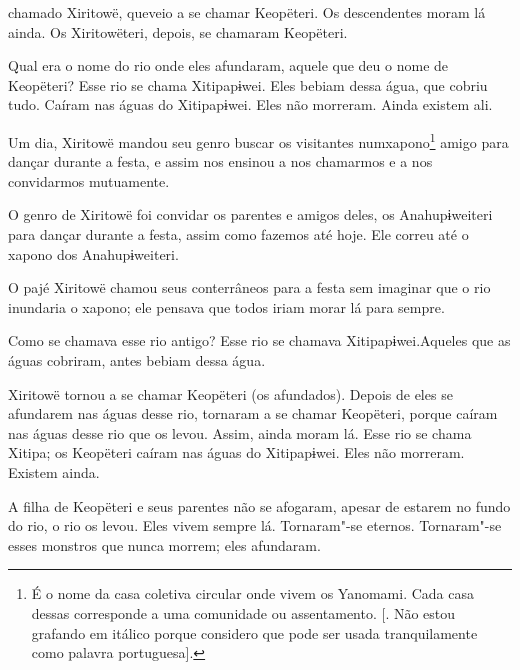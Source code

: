 
 chamado Xiritowë, queveio a se chamar Keopëteri. Os
descendentes moram lá ainda. Os Xiritowëteri, depois, se chamaram
Keopëteri. 

Qual era o nome do rio onde eles afundaram, aquele que deu o nome de
Keopëteri? Esse rio se chama Xitipapɨwei. Eles bebiam dessa água, que
cobriu tudo. Caíram nas águas do Xitipapɨwei. Eles não morreram. Ainda
existem ali. 

Um dia, Xiritowë mandou seu genro buscar os visitantes
numxapono\footnote{  É o nome da casa coletiva circular onde vivem os Yanomami. Cada casa
dessas corresponde a uma comunidade ou assentamento. [. Não estou
grafando em itálico porque considero que pode ser usada tranquilamente
como palavra portuguesa].}  amigo para dançar durante a festa, e assim
nos ensinou a nos chamarmos e a nos convidarmos mutuamente. 

O genro de Xiritowë foi convidar os parentes e amigos deles, os
Anahupɨweiteri para dançar durante a festa, assim como fazemos até hoje.
Ele correu até o xapono dos Anahupɨweiteri. 

O pajé Xiritowë chamou seus conterrâneos para a festa sem imaginar que o
rio inundaria o xapono; ele pensava que todos iriam morar lá para
sempre. 

Como se chamava esse rio {antigo}? Esse rio se chamava
Xitipapɨwei.Aqueles que as águas cobriram, antes bebiam dessa água. 

 Xiritowë tornou a se chamar Keopëteri (os afundados). Depois de eles se
afundarem nas águas desse rio, tornaram a se chamar Keopëteri, porque
caíram nas águas desse rio que os levou. Assim, ainda moram lá. Esse rio
se chama Xitipa; os Keopëteri caíram nas águas do Xitipapɨwei. Eles não
morreram. Existem ainda. 

A filha de Keopëteri e seus parentes não se afogaram, apesar de estarem
no fundo do rio, o rio os levou. Eles vivem sempre lá. Tornaram"-se
eternos. Tornaram"-se esses monstros que nunca morrem; eles afundaram.

 

